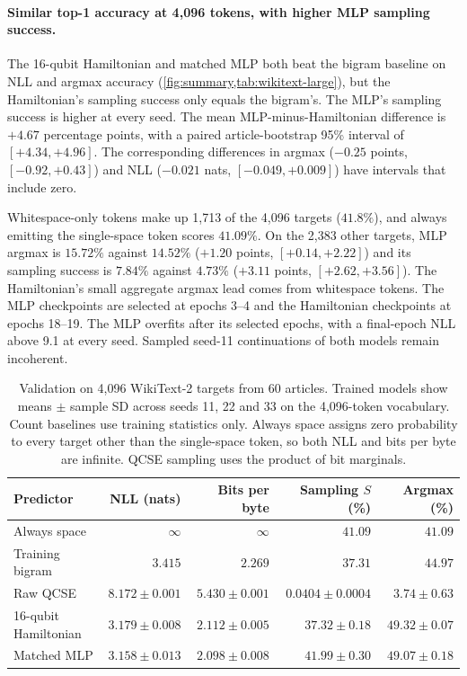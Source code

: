 \documentclass[11pt,a4paper]{article}
\begin{document}
\begin{samepage}
\paragraph{Similar top-1 accuracy at 4,096 tokens, with higher MLP sampling success.}
The 16-qubit Hamiltonian and matched MLP both beat the bigram baseline on NLL and argmax accuracy (\cref{fig:summary,tab:wikitext-large}), but the Hamiltonian's sampling success only equals the bigram's. The MLP's sampling success is higher at every seed. The mean MLP-minus-Hamiltonian difference is $+4.67$ percentage points, with a paired article-bootstrap 95\% interval of $[+4.34,+4.96]$. The corresponding differences in argmax ($-0.25$ points, $[-0.92,+0.43]$) and NLL ($-0.021$ nats, $[-0.049,+0.009]$) have intervals that include zero.

Whitespace-only tokens make up 1,713 of the 4,096 targets ($41.8\%$), and always emitting the single-space token scores $41.09\%$. On the 2,383 other targets, MLP argmax is $15.72\%$ against $14.52\%$ ($+1.20$ points, $[+0.14,+2.22]$) and its sampling success is $7.84\%$ against $4.73\%$ ($+3.11$ points, $[+2.62,+3.56]$). The Hamiltonian's small aggregate argmax lead comes from whitespace tokens. The MLP checkpoints are selected at epochs 3--4 and the Hamiltonian checkpoints at epochs 18--19. The MLP overfits after its selected epochs, with a final-epoch NLL above 9.1 at every seed. Sampled seed-11 continuations of both models remain incoherent.
\par\end{samepage}

\begin{table}[H]
  \centering\small
  \caption{Validation on 4,096 WikiText-2 targets from 60 articles. Trained models show means $\pm$ sample SD across seeds 11, 22 and 33 on the 4,096-token vocabulary. Count baselines use training statistics only. Always space assigns zero probability to every target other than the single-space token, so both NLL and bits per byte are infinite. QCSE sampling uses the product of bit marginals.}
  \label{tab:wikitext-large}
  \begin{tabular}{@{}lrrrr@{}}
    \toprule
    Predictor & NLL (nats) & Bits per byte & Sampling $S$ (\%) & Argmax (\%) \\
    \midrule
    Always space         & $\infty$        & $\infty$        & $41.09$           & $41.09$       \\
    Training bigram      & $3.415$         & $2.269$         & $37.31$           & $44.97$       \\
    \midrule
    Raw QCSE             & $8.172\pm0.001$ & $5.430\pm0.001$ & $0.0404\pm0.0004$ & $3.74\pm0.63$ \\
    16-qubit Hamiltonian & $3.179\pm0.008$ & $2.112\pm0.005$ & $37.32\pm0.18$ & $49.32\pm0.07$ \\
    Matched MLP          & $3.158\pm0.013$ & $2.098\pm0.008$ & $41.99\pm0.30$ & $49.07\pm0.18$ \\
    \bottomrule
  \end{tabular}
\end{table}
\end{document}
